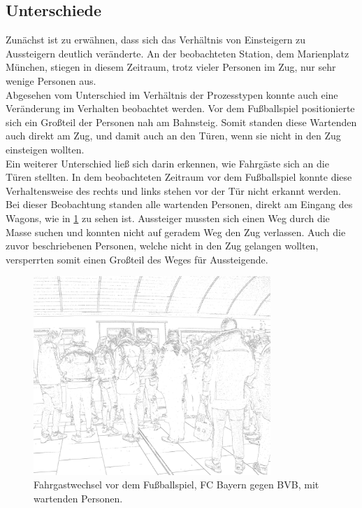 \subsection{Unterschiede}
Zunächst ist zu erwähnen, dass sich das Verhältnis von Einsteigern zu Aussteigern deutlich veränderte. An der beobachteten Station, dem Marienplatz München, stiegen in diesem Zeitraum, trotz vieler Personen im Zug, nur sehr wenige Personen aus.\\ 
Abgesehen vom Unterschied im Verhältnis der Prozesstypen konnte auch eine Veränderung im Verhalten beobachtet werden. Vor dem Fußballspiel positionierte sich ein Großteil der Personen nah am Bahnsteig. Somit standen diese Wartenden auch direkt am Zug, und damit auch an den Türen, wenn sie nicht in den Zug einsteigen wollten.\\
Ein weiterer Unterschied ließ sich darin erkennen, wie Fahrgäste sich an die Türen stellten. In dem beobachteten Zeitraum vor dem Fußballspiel konnte diese Verhaltensweise des rechts und links stehen vor der Tür nicht erkannt werden. Bei dieser Beobachtung standen alle wartenden Personen, direkt am Eingang des Wagons, wie in \figurename \ref{fig:fussballFahrgastwechsel} zu sehen ist. Aussteiger mussten sich einen Weg durch die Masse suchen und konnten nicht auf geradem Weg den Zug verlassen. Auch die zuvor beschriebenen Personen, welche nicht in den Zug gelangen wollten, versperrten somit einen Großteil des Weges für Aussteigende. \\
\begin{figure}[H]
	\centering
		\includegraphics[width=0.8\textwidth]{pictures/observation/football/exchange_football.png}
	\caption{Fahrgastwechsel vor dem Fußballspiel, FC Bayern gegen BVB, mit wartenden Personen.}
	\label{fig:fussballFahrgastwechsel}
\end{figure}
